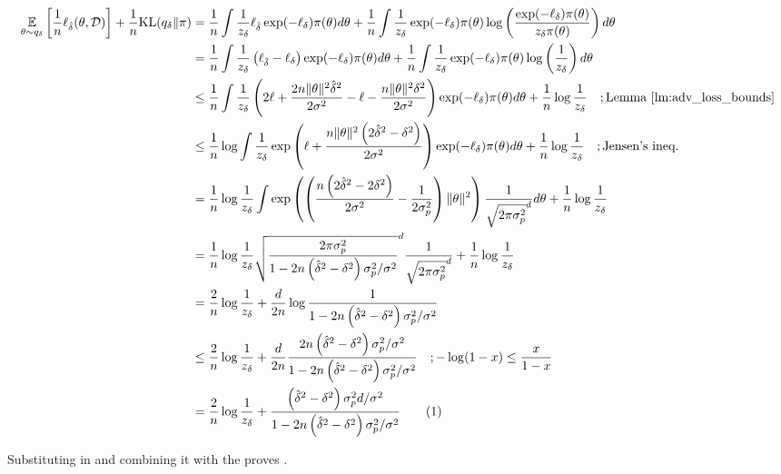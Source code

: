 \begin{align*}
    \expectation{\theta \sim {q_\delta}}{\frac{1}{n}{\ell}_{\deltat}(\theta, \mathcal{D})} + \frac{1}{n} \mathrm{KL}({q_\delta} \| \pi) 
    &= \frac{1}{n} \int \frac{1}{z_\delta }{\ell}_{\deltat}\exp(-{\ell}_\delta)\pi(\theta) d\theta + \frac{1}{n} \int \frac{1}{z_\delta } \exp(-{\ell}_\delta)\pi(\theta) \log \lp \frac{\exp(-{\ell}_\delta)\pi(\theta)}{z_\delta \pi(\theta)} \rp d\theta \\
    &= \frac{1}{n} \int \frac{1}{z_\delta }\lp {\ell}_{\deltat} - {\ell}_\delta \rp\exp(-{\ell}_\delta)\pi(\theta) d\theta + \frac{1}{n} \int \frac{1}{z_\delta } \exp(-{\ell}_\delta)\pi(\theta) \log \lp \frac{1}{z_\delta } \rp d\theta \\
    &\leq  \frac{1}{n} \int \frac{1}{z_\delta }\lp 2\ell + \frac{2n \| \theta \|^2 \deltat^2}{2\sigma^2} - \ell - \frac{n\|\theta \|^2\delta^2}{2\sigma^2} \rp\exp(-{\ell}_\delta)\pi(\theta) d\theta + \frac{1}{n}  \log \frac{1}{z_\delta } \quad; \text{Lemma \ref{lm:adv_loss_bounds}} \\
    &\leq \frac{1}{n} \log \int \frac{1}{z_\delta } \exp \lp \ell + \frac{n \|\theta\|^2 \lp 2\deltat^2 - \delta^2\rp}{2\sigma^2} \rp \exp(-{\ell}_\delta)\pi(\theta) d\theta +  \frac{1}{n} \log \frac{1}{z_\delta } \quad; \text{Jensen's ineq.} \\
    &= \frac{1}{n} \log \frac{1}{z_\delta } \int  \exp \lp \lp \frac{n \lp 2\deltat^2 - 2\delta^2 \rp}{2\sigma^2} - \frac{1}{2\sigma_p^2} \rp \|\theta\|^2  \rp \frac{1}{\sqrt{2\pi \sigma_p^2}^d} d\theta +  \frac{1}{n} \log \frac{1}{z_\delta } \\
    &= \frac{1}{n} \log \frac{1}{z_\delta } \sqrt{\frac{2\pi \sigma_p^2}{1-2n\lp \deltat^2 -\delta^2 \rp \sigma_p^2/\sigma^2}}^d \frac{1}{\sqrt{2\pi \sigma_p^2}^d} +   \frac{1}{n} \log \frac{1}{z_\delta } \\
    &=  \frac{2}{n} \log \frac{1}{z_\delta } + \frac{d}{2n} \log \frac{1}{1-2n\lp \deltat^2 -\delta^2 \rp \sigma_p^2/\sigma^2} \\
    &\leq  \frac{2}{n} \log \frac{1}{z_\delta } + \frac{d}{2n} \frac{2n\lp \deltat^2 -\delta^2 \rp \sigma_p^2/\sigma^2}{1-2n\lp \deltat^2 -\delta^2 \rp \sigma_p^2/\sigma^2} \quad; -\log(1-x) \leq \frac{x}{1-x} \\
    &= \frac{2}{n} \log \frac{1}{z_\delta } + \frac{\lp \deltat^2 -\delta^2 \rp \sigma_p^2 d/\sigma^2}{1-2n\lp \deltat^2 -\delta^2 \rp \sigma_p^2/\sigma^2} \stepcounter{equation}\tag{\theequation}\label{eq:adv_post_adv_loss_normz_gen}
\end{align*}

Substituting  in  and combining it with the  proves .

\FloatBarrier